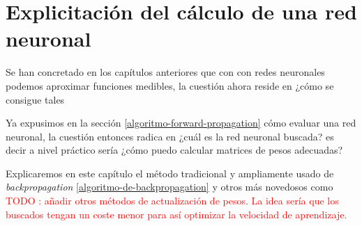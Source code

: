 %
%

\chapter{Explicitación del cálculo de una red neuronal}

Se han concretado en los capítulos anteriores que con con redes neuronales 
podemos aproximar funciones medibles, la cuestión ahora reside en ¿cómo se consigue tales 

Ya expusimos en la sección \ref{algoritmo-forward-propagation} cómo evaluar
una red neuronal, la cuestión entonces radica en ¿cuál es la red neuronal
buscada? es decir a nivel práctico sería ¿cómo puedo calcular matrices de pesos 
adecuadas?

Explicaremos en este capítulo el método tradicional y ampliamente usado de 
\textit{backpropagation} \ref{algoritmo-de-backpropagation} y otros más novedosos como
\textcolor{red}{TODO : añadir otros métodos de actualización de pesos. La idea sería que 
los buscados tengan un coste menor para así optimizar la velocidad de aprendizaje.}

